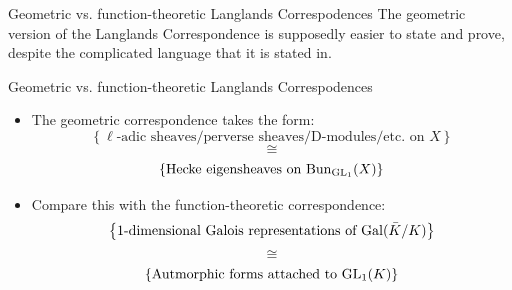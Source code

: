 \documentclass[professionalfonts]{beamer}
\begin{document}
    \begin{frame}{Geometric vs. function-theoretic Langlands Correspodences}
        The geometric version of the Langlands Correspondence is supposedly easier to state and prove, despite the complicated language that it is stated in. 
    \end{frame}
    
    \begin{frame}{Geometric vs. function-theoretic Langlands Correspodences}
        \begin{itemize}
            \item The geometric correspondence takes the form:
                $$\left\{\text{$\ell$-adic sheaves/perverse sheaves/D-modules/etc. on $X$}\right\}$$
                $$\cong$$
                $$\left\{\text{Hecke eigensheaves on $\mathrm{Bun}_{\operatorname{GL}_1}(X)$}\right\}$$
            \item Compare this with the function-theoretic correspondence:
                $$\left\{\text{$1$-dimensional Galois representations of $\mathrm{Gal}(\bar{K}/K)$}\right\}$$
                $$\cong$$
                $$\left\{\text{Autmorphic forms attached to $\operatorname{GL}_1(K)$}\right\}$$
        \end{itemize}
    \end{frame}
\end{document}
